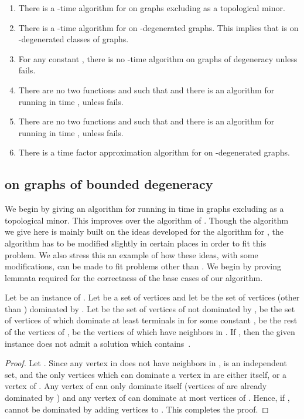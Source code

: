 \begin{enumerate}
\item There is a -time algorithm for \ds{} on graphs excluding  as a topological minor.
\item There is a -time algorithm for \ds{} on -degenerated graphs. This implies that \ds{} is \FPT{} on -degenerated classes of graphs.
\item For any constant , there is no -time algorithm on graphs of degeneracy  unless {\ETH} fails.
\item  There are no two functions  and  such that  and there is an algorithm for {\ds} running in time , unless {\ETH} fails.
\item  There are no two functions  and  such that  and there is an algorithm for {\ds} running in time , unless {\ETH} fails.
\item There is a  time factor  approximation algorithm for {\ds} on -degenerated graphs.
\end{enumerate}

\subsection{{\ds} on graphs of bounded degeneracy}

We begin by giving an algorithm for {\ds} running in time  in graphs excluding  as a topological minor. This improves over the  algorithm of \cite{AlonG09}. Though the algorithm we give here is mainly built on the ideas developed for the algorithm for {\dst}, the algorithm has to be modified slightly in certain places in order to fit this problem. We also stress this an example of how these ideas, with some modifications, can be made to fit problems other than {\dst}. We begin by proving lemmata required for the correctness of the base cases of our algorithm.


\begin{lemma}\label{lem:base_case_domset}
 Let  be an instance of {\ds}. Let  be a set of vertices and let  be the set of vertices (other than ) dominated by . Let  be the set of vertices of  not dominated by ,  be the set of vertices of  which dominate at least  terminals in  for some constant ,  be the rest of the vertices of ,  be the vertices of  which have neighbors in . If , then the given instance does not admit a solution which contains~.
\end{lemma}
\begin{proof}
Let . Since any vertex in  does not have neighbors in ,  is an independent set, and the only vertices which can dominate a vertex in  are either itself, or a vertex of . Any vertex of  can only dominate itself (vertices of  are already dominated by ) and any vertex of  can dominate at most  vertices of . Hence, if ,  cannot be dominated by adding  vertices to . This completes the proof.  
\end{proof}






